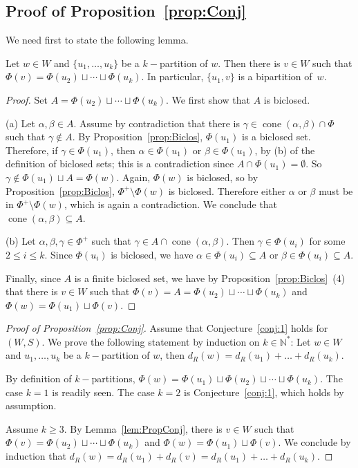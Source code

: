 \documentclass[ALCO,Unicode]{cedram}
\theoremstyle{definition}
\newcommand{\cone}{\operatorname{cone}}
\begin{document}
\subsection{Proof of Proposition~\ref{prop:Conj}}  We need first to state the following lemma.

\begin{lemm}\label{lem:PropConj} Let  $w\in W$ and $\{u_1,\dots,u_k\}$ be a $k-$partition of $w$. Then there is $v\in W$ such that $\Phi(v)=\Phi(u_2) \sqcup \cdots \sqcup \Phi(u_{k})$. In particular, $\{u_1,v\}$ is a bipartition of~$w$.
\end{lemm}
\begin{proof} Set $A=\Phi(u_2) \sqcup \cdots \sqcup \Phi(u_{k})$.  We first show that $A$ is biclosed. 



(a) Let $\alpha,\beta \in A$. Assume by contradiction that there is $\gamma\in \cone(\alpha,\beta)\cap \Phi$ such that $\gamma\notin A$.  By Proposition~\ref{prop:Biclos}, $\Phi(u_1)$ is a biclosed set. Therefore, if $\gamma\in \Phi(u_1)$, then  $\alpha\in\Phi(u_1)$ or $\beta\in \Phi(u_1)$,  by (b) of the definition of biclosed sets; this is a contradiction since $A\cap \Phi(u_1)=\emptyset$. So $\gamma\notin  \Phi(u_1)\sqcup A=\Phi(w)$. Again, $\Phi(w)$ is biclosed, so by Proposition~\ref{prop:Biclos}, $\Phi^+\setminus \Phi(w)$ is biclosed. Therefore either $\alpha$ or $\beta$ must be in $\Phi^+\setminus \Phi(w)$, which is again a contradiction. We conclude that $\cone(\alpha,\beta)\subseteq A$.



(b)  Let $\alpha,\beta,\gamma\in \Phi^+$ such that $\gamma\in A\cap \cone(\alpha,\beta)$. Then $\gamma\in \Phi(u_i)$ for some $2\leq i\leq k$. Since $\Phi(u_i)$ is biclosed, we have $\alpha\in\Phi(u_i)\subseteq A$ or $\beta\in \Phi(u_i)\subseteq A$.



Finally, since $A$ is a finite biclosed set, we have by Proposition~\ref{prop:Biclos}~(4) that there is $v\in W$ such that $\Phi(v)=A=\Phi(u_2) \sqcup \cdots \sqcup \Phi(u_{k})$ and $\Phi(w)=\Phi(u_1)\sqcup \Phi(v)$. 
\end{proof}

\begin{proof}[Proof of Proposition~\ref{prop:Conj}] Assume that Conjecture~\ref{conj:1} holds for $(W,S)$. We prove the following statement by induction on $k\in\mathbb N^*$: Let  $w\in W$ and $u_1,\dots,u_k$ be a $k-$partition of $w$, then $d_R(w)=d_R(u_1)+\dots+d_R(u_k)$.

By definition of $k-$partitions, $\Phi(w)=\Phi(u_1)\sqcup \Phi(u_2) \sqcup \cdots \sqcup \Phi(u_{k})$.
The case $k=1$ is readily seen. The case $k=2$ is  Conjecture~\ref{conj:1}, which holds by assumption.

Assume $k\geq 3$. By Lemma~\ref{lem:PropConj}, there is $v\in W$ such that $\Phi(v)=\Phi(u_2) \sqcup \cdots \sqcup \Phi(u_{k})$ and $\Phi(w)=\Phi(u_1)\sqcup \Phi(v)$. We conclude by induction  that  $d_R(w)=d_R(u_1)+d_R(v)=d_R(u_1)+\dots+d_R(u_k)$. 
\end{proof}
\end{document}
